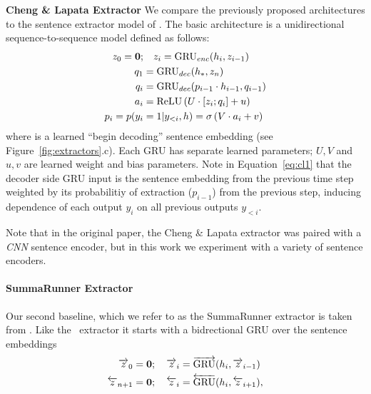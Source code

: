 {\textbf{Cheng \& Lapata Extractor} 
We compare the previously proposed architectures to the sentence extractor
model of \cite{cheng2016neural}. 
The basic architecture is a unidirectional
sequence-to-sequence
model defined as follows:
\begin{align}
    \encExtHidden_0 = \textbf{0};&\quad   \encExtHidden_i = \gru_{enc}(\sentvec_i, \encExtHidden_{i-1}) \\
    \decExtHidden_1 &= \gru_{dec}(\sentEmb[*], \encExtHidden_{\docSize}) \\
    \decExtHidden_i &= \gru_{dec}(p_{i-1} \cdot \sentvec_{i-1}, \decExtHidden_{i-1}) \label{eq:cl1} \\
   \logits_i &= \relu\left(U \cdot [\encExtHidden_i; \decExtHidden_i] + u \right)\\
    p_i = p(\slabel_i&=1|\slabel_{<i}, \sentvec) = \sigma\left(V\cdot \logits_i + v  \right) 
\end{align}
where \sentEmb[*] is a learned ``begin decoding'' sentence embedding
(see Figure~\ref{fig:extractors}.c).
Each GRU has separate learned 
parameters; $U, V$ and $u, v$ are learned weight and bias parameters.
Note in Equation~\ref{eq:cl1} that 
the decoder side GRU input is the sentence embedding from the previous time
step weighted by its probabilitiy of extraction ($p_{i-1}$) from the 
previous step, inducing dependence of each output $y_i$ on all previous 
outputs $y_{<i}$.


Note that in the original paper, the Cheng \& Lapata extractor was paired 
with
a \textit{CNN} sentence encoder, but in this work we experiment with a variety
of sentence encoders.


\paragraph{SummaRunner Extractor}{
Our second baseline, which we refer to as the SummaRunner extractor is taken 
from 
\cite{nallapati2017summarunner}.
Like the
\modelOne~extractor it starts with a bidrectional GRU over the sentence 
embeddings 
\begin{align}
    \overrightarrow{z}_0 = \textbf{0}&;\quad \overrightarrow{z}_i = \overrightarrow{\operatorname{GRU}}(h_i, \overrightarrow{z}_{i-1}) \\
    \overleftarrow{z}_{n + 1} = \textbf{0}&;\quad \overleftarrow{z}_i = \overleftarrow{\operatorname{GRU}}(h_i, \overleftarrow{z}_{i+1}),
\end{align}
}

}
